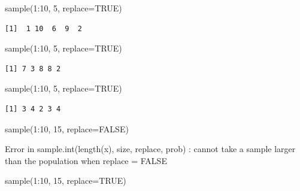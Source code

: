 \documentclass[
  letterpaper,
  DIV=11,
  numbers=noendperiod]{scrreprt}
\newenvironment{Shaded}{\begin{snugshade}}{\end{snugshade}}
\newcommand{\AttributeTok}[1]{\textcolor[rgb]{0.40,0.45,0.13}{#1}}
\newcommand{\ConstantTok}[1]{\textcolor[rgb]{0.56,0.35,0.01}{#1}}
\newcommand{\DecValTok}[1]{\textcolor[rgb]{0.68,0.00,0.00}{#1}}
\newcommand{\FunctionTok}[1]{\textcolor[rgb]{0.28,0.35,0.67}{#1}}
\newcommand{\NormalTok}[1]{\textcolor[rgb]{0.00,0.23,0.31}{#1}}
\newcommand{\SpecialCharTok}[1]{\textcolor[rgb]{0.37,0.37,0.37}{#1}}
\begin{document}
\begin{Shaded}
\begin{Highlighting}[]
\FunctionTok{sample}\NormalTok{(}\DecValTok{1}\SpecialCharTok{:}\DecValTok{10}\NormalTok{, }\DecValTok{5}\NormalTok{, }\AttributeTok{replace=}\ConstantTok{TRUE}\NormalTok{)}
\end{Highlighting}
\end{Shaded}

\begin{verbatim}
[1]  1 10  6  9  2
\end{verbatim}

\begin{Shaded}
\begin{Highlighting}[]
\FunctionTok{sample}\NormalTok{(}\DecValTok{1}\SpecialCharTok{:}\DecValTok{10}\NormalTok{, }\DecValTok{5}\NormalTok{, }\AttributeTok{replace=}\ConstantTok{TRUE}\NormalTok{)}
\end{Highlighting}
\end{Shaded}

\begin{verbatim}
[1] 7 3 8 8 2
\end{verbatim}

\begin{Shaded}
\begin{Highlighting}[]
\FunctionTok{sample}\NormalTok{(}\DecValTok{1}\SpecialCharTok{:}\DecValTok{10}\NormalTok{, }\DecValTok{5}\NormalTok{, }\AttributeTok{replace=}\ConstantTok{TRUE}\NormalTok{)}
\end{Highlighting}
\end{Shaded}

\begin{verbatim}
[1] 3 4 2 3 4
\end{verbatim}

\begin{Shaded}
\begin{Highlighting}[]
\FunctionTok{sample}\NormalTok{(}\DecValTok{1}\SpecialCharTok{:}\DecValTok{10}\NormalTok{, }\DecValTok{15}\NormalTok{, }\AttributeTok{replace=}\ConstantTok{FALSE}\NormalTok{)}
\end{Highlighting}
\end{Shaded}

{Error in sample.int(length(x), size, replace, prob) : cannot take a
sample larger than the population when \textquotesingle replace =
FALSE\textquotesingle{}}

\begin{Shaded}
\begin{Highlighting}[]
\FunctionTok{sample}\NormalTok{(}\DecValTok{1}\SpecialCharTok{:}\DecValTok{10}\NormalTok{, }\DecValTok{15}\NormalTok{, }\AttributeTok{replace=}\ConstantTok{TRUE}\NormalTok{)}
\end{Highlighting}
\end{Shaded}
\end{document}
